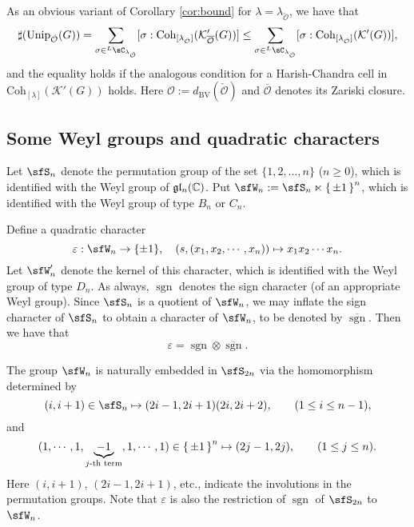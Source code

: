 \documentclass[12pt,a4paper]{amsart}
\newcommand{\CK}{{\mathcal {K}}}
\newcommand{\CO}{{\mathcal {O}}}
\newcommand{\sgn}{\operatorname{sgn}}
\newcommand{\g}{\mathfrak g}
\renewcommand{\l}{\mathfrak l}
\newcommand{\be}{\begin {equation}}
\newcommand{\ee}{\end {equation}}
\numberwithin{equation}{section}
\theoremstyle{remark}
\def\Unip{\mathrm{Unip}}
\def\dBV{d_{\mathrm{BV}}}
\def\LC{{}^{\scriptscriptstyle L}\sC}
\def\bsgn{\overline{\sgn}}
\def\Coh{\mathrm{Coh}}
\newcommand{\Lam}{{[\lambda]}}
\begin{document}
As an obvious variant of Corollary \ref{cor:bound} for $\lambda=\lambda_{\check \CO}$, we have  that
 \begin{equation}\label{boundc22}
     \sharp(\Unip_{\check \CO}(G)) =\sum_{\sigma\in \LC_{\lambda_{\check \CO}}} [\sigma: \Coh_{[\lambda_{\check \CO}]}(\CK_{\overline{\CO}}'(G))]  \leq \sum_{\sigma\in \LC_{\lambda_{\check \CO}}} [\sigma: \Coh_{[\lambda_{\check \CO}]}(\CK'(G))],
   \end{equation}
   and the equality holds if the analogous condition for a Harish-Chandra cell in $\Coh_{\Lam}(\CK'(G))$ holds.
Here $\CO:=\dBV(\check \CO)$ and $\overline{\CO}$ denotes its Zariski closure.




\subsection{Some Weyl groups and quadratic characters}


Let $\sfS_n$ denote the permutation group of the set $\{1,2, \dots, n\}$ ($n\geq 0$), which is identified with the Weyl group of $\g\l_n(\C)$.
Put $\sfW_n := \sfS_n \ltimes \set{\pm 1}^n$, which is identified with  the Weyl group of type $B_n$
or $C_n$.

Define a quadratic character
\be\label{defep}
  \varepsilon: \sfW_n\rightarrow \{\pm 1\}, \quad (s,(x_{1}, x_{2}, \cdots, x_{n}))\mapsto x_{1}x_{2}\cdots x_{n}.
\ee
Let $\sfW_n'$ denote the kernel of this character, which is identified with  the Weyl group of type $D_n$. As always, $\sgn$ denotes the sign character (of an appropriate Weyl group).
Since $\sfS_{n}$ is a quotient of $\sfW_{n}$, we may inflate the sign character of $\sfS_{n}$ to obtain a character of $\sfW_{n}$, to be denoted by $\bsgn$. Then we have that
\[\varepsilon = \sgn \otimes \bsgn.\]




The group $\sfW_n$ is naturally embedded in $\sfS_{2n}$ via the homomorphism determined by
\be\label{wn1}
(i, i+1)\in \sfS_n\mapsto (2 i-1, 2i+1)(2i, 2i+2), \qquad (1\leq i\leq n-1),
\ee
and
       \be\label{wn2}
       (1,\cdots,1, \underbrace{-1}_{j\text{-th
        term}}, 1, \cdots, 1)\in \set{\pm 1}^n  \mapsto (2j-1, 2j), \qquad (1\leq j\leq n).
        \ee
Here $(i, i+1)$, $(2 i-1, 2i+1)$, etc., indicate the involutions in the permutation groups.  Note that $\varepsilon $ is also the restriction of $\sgn$ of $\sfS_{2n}$ to $\sfW_n$.
\end{document}
